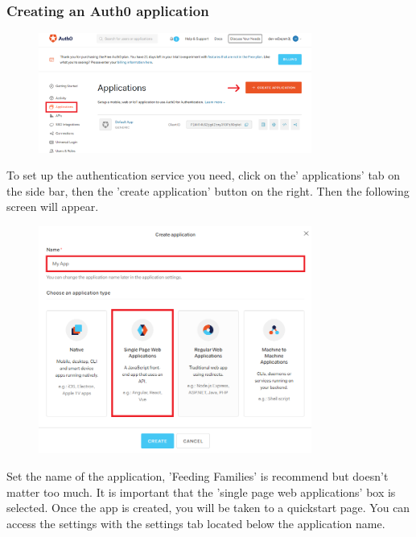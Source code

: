 \documentclass[12pt]{article}
\begin{document}
\subsubsection{Creating an Auth0 application}
\begin{figure}[H]
    \centering
    \includegraphics[width=0.8\textwidth]{auth0/application.png}
\end{figure}
\noindent
To set up the authentication service you need, click on the' applications' tab on the side bar, then the 'create application' button on the right. Then the following screen will appear.
\begin{figure}[H]
    \centering
    \includegraphics[width=0.8\textwidth]{auth0/createapp.png}
\end{figure}
\noindent
Set the name of the application, 'Feeding Families' is recommend but doesn't matter too much. It is important that the 'single page web applications' box is selected. Once the app is created, you will be taken to a quickstart page. You can      access the settings with the settings tab located below the application name.\\
\end{document}
